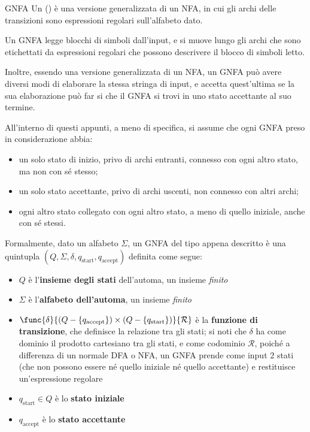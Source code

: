 \documentclass[a4paper, 12pt]{report}
\begin{document}
    \begin{frameddefn}[label={def gnfa}]{GNFA}
        Un  () è una versione generalizzata di un NFA, in cui gli archi delle transizioni sono espressioni regolari sull'alfabeto dato.

        Un GNFA legge blocchi di simboli dall'input, e si muove lungo gli archi che sono etichettati da espressioni regolari che possono descrivere il blocco di simboli letto.

        Inoltre, essendo una versione generalizzata di un NFA, un GNFA può avere diversi modi di elaborare la stessa stringa di input, e accetta quest'ultima se la sua elaborazione può far si che il GNFA si trovi in uno stato accettante al suo termine.

         All'interno di questi appunti, a meno di specifica, si assume che ogni GNFA preso in considerazione abbia:

        \begin{itemize}
            \item un solo stato di inizio, privo di archi entranti, connesso con ogni altro stato, ma non con sé stesso;
            \item un solo stato accettante, privo di archi uscenti, non connesso con altri archi;
            \item ogni altro stato collegato con ogni altro stato, a meno di quello iniziale, anche con sé stessi.
        \end{itemize}

        Formalmente, dato un alfabeto $\Sigma$, un GNFA del tipo appena descritto è una quintupla $(Q, \Sigma, \delta, q_{\mathrm{start}}, q_{\mathrm{accept}})$ definita come segue:

        \begin{itemize}
            \item $Q$ è l'\textbf{insieme degli stati} dell'automa, un insieme \textit{finito}
            \item $\Sigma$ è l'\textbf{alfabeto dell'automa}, un insieme \textit{finito}
            \item $\func{\delta}{(Q - \{q_{\mathrm{accept}}\}) \times (Q - \{q_{\mathrm{start}}\})}{\mathcal{R}}$ è la \textbf{funzione di transizione}, che definisce la relazione tra gli stati; si noti che $\delta$ ha come dominio il prodotto cartesiano tra gli stati, e come codominio $\mathcal{R}$, poiché a differenza di un normale DFA o NFA, un GNFA prende come input 2 stati (che non possono essere né quello iniziale né quello accettante) e restituisce un'espressione regolare
            \item $q_{\mathrm{start}} \in Q$ è lo \textbf{stato iniziale}
            \item $q_{\mathrm{accept}}$ è lo \textbf{stato accettante}
        \end{itemize}
    \end{frameddefn}
\end{document}
